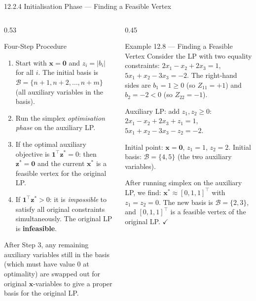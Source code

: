 \documentclass[aspectratio=169,10pt]{beamer}
\newcommand{\xv}{\mathbf{x}}
\newcommand{\zv}{\mathbf{z}}
\newcommand{\calB}{\mathcal{B}}
\begin{document}
\begin{frame}[allowframebreaks]{12.2.4 Initialisation Phase --- Finding a Feasible Vertex}
\framebreak

\begin{columns}
  \begin{column}{0.53\textwidth}
    \begin{block}{Four-Step Procedure}
      \begin{enumerate}
        \item Start with $\xv = \mathbf{0}$ and $z_i = |b_i|$ for all $i$.
              The initial basis is $\calB = \{n+1, n+2, \ldots, n+m\}$
              (all auxiliary variables in the basis).
        \item Run the simplex \emph{optimisation phase} on the auxiliary LP.
        \item If the optimal auxiliary objective is $\mathbf{1}^\top\zv^* = 0$:
              then $\zv^* = \mathbf{0}$ and the current $\xv^*$ is a feasible
              vertex for the original LP.
        \item If $\mathbf{1}^\top\zv^* > 0$: it is \emph{impossible} to satisfy
              all original constraints simultaneously.  The original LP is
              \textbf{infeasible}.
      \end{enumerate}
    \end{block}

    After Step 3, any remaining auxiliary variables still in the basis (which
    must have value 0 at optimality) are swapped out for original $\xv$-variables
    to give a proper basis for the original LP.
  \end{column}
  \begin{column}{0.45\textwidth}
    \begin{exampleblock}{Example 12.8 --- Finding a Feasible Vertex}
      \footnotesize
      Consider the LP with two equality constraints:
      $2x_1 - x_2 + 2x_3 = 1$, $5x_1 + x_2 - 3x_3 = -2$.
      The right-hand sides are $b_1 = 1 \ge 0$ (so $Z_{11} = +1$) and
      $b_2 = -2 < 0$ (so $Z_{22} = -1$).

      Auxiliary LP: add $z_1, z_2 \ge 0$:
      $2x_1 - x_2 + 2x_3 + z_1 = 1$,\quad $5x_1 + x_2 - 3x_3 - z_2 = -2$.

      Initial point: $\xv = \mathbf{0}$, $z_1 = 1$, $z_2 = 2$.
      Initial basis: $\calB = \{4, 5\}$ (the two auxiliary variables).

      After running simplex on the auxiliary LP, we find:
      $\xv^* \approx [0, 1, 1]^\top$ with $z_1 = z_2 = 0$.
      The new basis is $\calB = \{2, 3\}$, and
      $[0, 1, 1]^\top$ is a feasible vertex of the original LP. $\checkmark$
    \end{exampleblock}
  \end{column}
\end{columns}

\end{frame}
\end{document}
